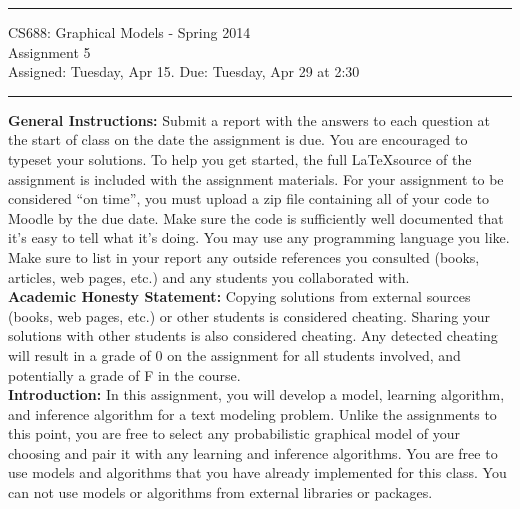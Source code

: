 \documentclass[11pt]{article}
\begin{document}

{\centering
  \rule{6.3in}{2pt}
  \vspace{1em}
  {\Large
    CS688: Graphical Models - Spring 2014\\
    Assignment 5\\
  }
  \vspace{1em}
  Assigned: Tuesday, Apr 15. Due: Tuesday, Apr 29 at 2:30 \\
  \vspace{0.1em}
  \rule{6.3in}{1.5pt}
}
\vspace{1pc}

\textbf{General Instructions:} Submit a report with the answers to each question at the start of class on the date the assignment is due. You are encouraged to typeset your solutions. To help you get started, the full \LaTeX source of the assignment is included with the assignment materials. For your assignment to be considered ``on time'', you must upload a zip file containing all of your code to Moodle by the due date. Make sure the code is sufficiently well documented that it's easy to tell what it's doing. You may use any programming language you like. Make sure to list in your report any outside references you consulted (books, articles, web pages, etc.) and any students you collaborated with.\\ 

\textbf{Academic Honesty Statement:} Copying solutions from external
sources (books, web pages, etc.) or other students is considered
cheating. Sharing your solutions with other students is also
considered cheating. Any detected cheating will result in a grade of 0
on the assignment for all students involved, and potentially a grade
of F in the course.\\


\textbf{Introduction:} In this assignment, you will develop a model, learning algorithm, and inference algorithm for a text modeling problem. Unlike the assignments to this point, you are free to select any probabilistic graphical model of your choosing and pair it with any learning and inference algorithms. You are free to use models and algorithms that you have already implemented for this class. You can not use models or algorithms from external libraries or packages.  \\
\end{document}
